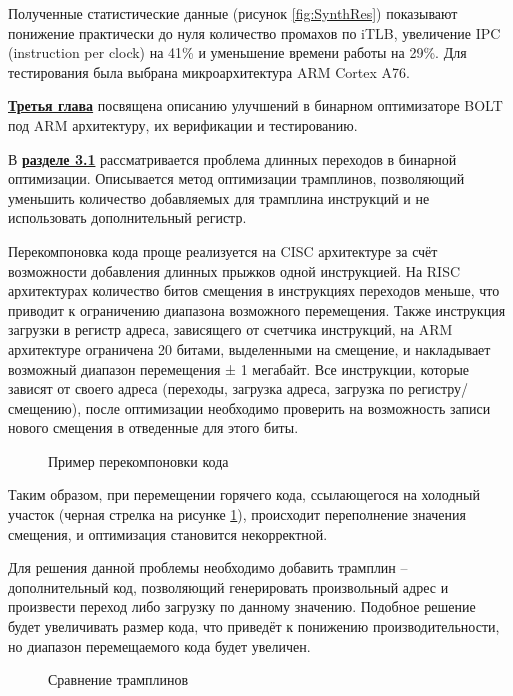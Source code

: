 Полученные статистические данные  (рисунок \cref{fig:SynthRes}) показывают понижение практически до нуля количество промахов по iTLB, увеличение IPC (instruction per clock) на 41\% и уменьшение времени работы на 29\%. Для тестирования была выбрана микроархитектура ARM Cortex A76.

\underline{\textbf{Третья глава}} посвящена описанию улучшений в бинарном оптимизаторе BOLT под ARM архитектуру, их верификации и тестированию.

В \underline{\textbf{разделе 3.1}} рассматривается проблема длинных переходов в бинарной оптимизации. Описывается метод оптимизации трамплинов, позволяющий уменьшить количество добавляемых для трамплина инструкций и не использовать дополнительный регистр.

Перекомпоновка кода проще реализуется на CISC архитектуре за счёт возможности добавления длинных прыжков одной инструкцией. На RISC архитектурах количество битов смещения в инструкциях переходов меньше, что приводит к ограничению диапазона возможного перемещения. Также инструкция загрузки в регистр адреса, зависящего от счетчика инструкций, на ARM архитектуре ограничена 20 битами, выделенными на смещение, и накладывает возможный диапазон перемещения ± 1 мегабайт. Все инструкции, которые зависят от своего адреса (переходы, загрузка адреса, загрузка по регистру/смещению), после оптимизации необходимо проверить на возможность записи нового смещения в отведенные для этого биты.

\begin{figure}[H]
    \centerfloat{
        \texttt{[image: 11]}
    }
    \caption{Пример перекомпоновки кода}\label{fig:HotMove}
\end{figure}

Таким образом, при перемещении горячего кода, ссылающегося на холодный участок (черная стрелка на рисунке \cref{fig:HotMove}), происходит переполнение значения смещения, и оптимизация становится некорректной.

Для решения данной проблемы необходимо добавить трамплин – дополнительный код, позволяющий генерировать произвольный адрес и произвести переход либо загрузку по данному значению. Подобное решение будет увеличивать размер кода, что приведёт к понижению производительности, но диапазон перемещаемого кода будет увеличен.

\begin{figure}[!h]
    \caption{Сравнение трамплинов}\label{fig:CompTramp}
\end{figure}

